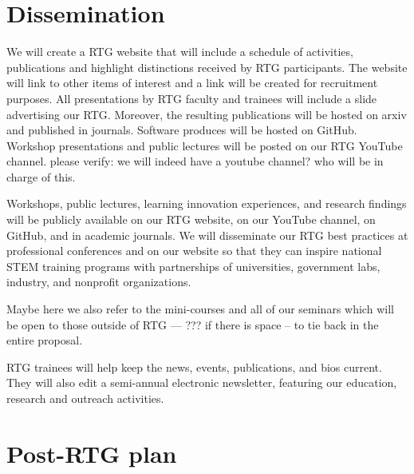 \documentclass[11pt]{NSFamsart}
\begin{document}
{ \section{Dissemination}
 We will create a   RTG website that will include a schedule of activities, publications and highlight
distinctions received by RTG participants. The website will link to other items of interest and a link will
be created for recruitment purposes. All presentations by RTG faculty and trainees  will    include a slide advertising our RTG.
Moreover, the resulting publications   will be hosted on arxiv and published in journals.  Software produces will be hosted on GitHub.  Workshop  presentations and  public lectures will be posted on our RTG YouTube channel. {\color{red}please verify: we will indeed have a youtube channel? who will be in charge of this.}

Workshops, public lectures, learning innovation experiences, and research findings will be publicly available on our  RTG website, on our YouTube channel, on GitHub, and in academic journals. We will disseminate our RTG best practices at professional conferences and on our website so that they can inspire national STEM  training programs with partnerships of universities, government labs, industry, and nonprofit organizations.

{\color{cyan}Maybe here we also refer to the mini-courses and all of our seminars which will be open to those outside of RTG --- ??? if there is space -- to tie back in the entire proposal. }



 

RTG trainees will help keep the news, events, publications, and bios current.  They will also edit a semi-annual electronic newsletter, 
featuring our education, research  and outreach  activities. 

 
 \section{Post-RTG plan}

}
\end{document}
